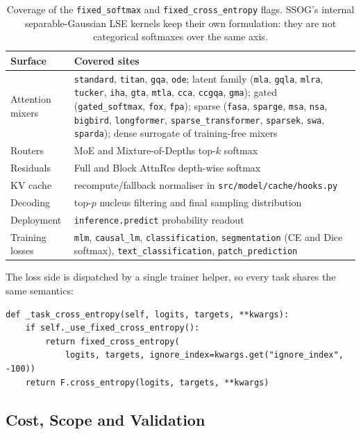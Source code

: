 \begin{table}[H]
\centering
\small
\begin{tabular}{L{4.1cm}L{8.8cm}}
\toprule
\textbf{Surface} & \textbf{Covered sites} \\
\midrule
Attention mixers & \texttt{standard}, \texttt{titan}, \texttt{gqa}, \texttt{ode}; latent family (\texttt{mla}, \texttt{gqla}, \texttt{mlra}, \texttt{tucker}, \texttt{iha}, \texttt{gta}, \texttt{mtla}, \texttt{cca}, \texttt{ccgqa}, \texttt{gma}); gated (\texttt{gated\_softmax}, \texttt{fox}, \texttt{fpa}); sparse (\texttt{fasa}, \texttt{sparge}, \texttt{msa}, \texttt{nsa}, \texttt{bigbird}, \texttt{longformer}, \texttt{sparse\_transformer}, \texttt{sparsek}, \texttt{swa}, \texttt{sparda}); dense surrogate of training-free mixers \\
Routers & MoE and Mixture-of-Depths top-$k$ softmax \\
Residuals & Full and Block AttnRes depth-wise softmax \\
KV cache & recompute/fallback normaliser in \texttt{src/model/cache/hooks.py} \\
Decoding & top-$p$ nucleus filtering and final sampling distribution \\
Deployment & \texttt{inference.predict} probability readout \\
Training losses & \texttt{mlm}, \texttt{causal\_lm}, \texttt{classification}, \texttt{segmentation} (CE and Dice softmax), \texttt{text\_classification}, \texttt{patch\_prediction} \\
\bottomrule
\end{tabular}
\caption{Coverage of the \texttt{fixed\_softmax} and \texttt{fixed\_cross\_entropy} flags. SSOG's internal separable-Gaussian LSE kernels keep their own formulation: they are not categorical softmaxes over the same axis.}
\label{tab:fixed-coverage}
\end{table}

The loss side is dispatched by a single trainer helper, so every task shares the same semantics:
\begin{verbatim}
def _task_cross_entropy(self, logits, targets, **kwargs):
    if self._use_fixed_cross_entropy():
        return fixed_cross_entropy(
            logits, targets, ignore_index=kwargs.get("ignore_index", -100))
    return F.cross_entropy(logits, targets, **kwargs)
\end{verbatim}

\subsection{Cost, Scope and Validation}
\label{sec:fixed-validation}

